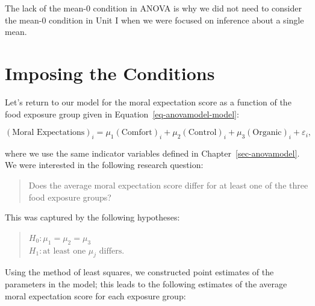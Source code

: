 \documentclass[
  letterpaper,
  DIV=11,
  numbers=noendperiod]{scrreprt}
\theoremstyle{plain}
\theoremstyle{definition}
\theoremstyle{definition}
\theoremstyle{remark}
\begin{document}
\begin{tcolorbox}[enhanced jigsaw, breakable, titlerule=0mm, colframe=quarto-callout-note-color-frame, bottomtitle=1mm, opacityback=0, rightrule=.15mm, toptitle=1mm, arc=.35mm, bottomrule=.15mm, left=2mm, title=\textcolor{quarto-callout-note-color}{\faInfo}\hspace{0.5em}{Note}, leftrule=.75mm, coltitle=black, toprule=.15mm, colbacktitle=quarto-callout-note-color!10!white, colback=white, opacitybacktitle=0.6]

The lack of the mean-0 condition in ANOVA is why we did not need to
consider the mean-0 condition in Unit I when we were focused on
inference about a single mean.

\end{tcolorbox}

\section{Imposing the Conditions}\label{imposing-the-conditions-1}

Let's return to our model for the moral expectation score as a function
of the food exposure group given in Equation~\ref{eq-anovamodel-model}:

\[(\text{Moral Expectations})_i = \mu_1 (\text{Comfort})_i + \mu_2 (\text{Control})_i + \mu_3 (\text{Organic})_i + \varepsilon_i,\]

where we use the same indicator variables defined in
Chapter~\ref{sec-anovamodel}. We were interested in the following
research question:

\begin{quote}
Does the average moral expectation score differ for at least one of the
three food exposure groups?
\end{quote}

This was captured by the following hypotheses:

\begin{quote}
\(H_0: \mu_1 = \mu_2 = \mu_3\)\\
\(H_1: \text{at least one } \mu_j \text{ differs}.\)
\end{quote}

Using the method of least squares, we constructed point estimates of the
parameters in the model; this leads to the following estimates of the
average moral expectation score for each exposure group:
\end{document}
